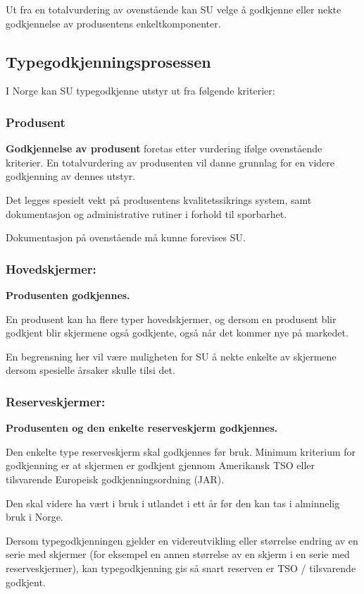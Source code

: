 Ut fra en totalvurdering av ovenstående kan SU velge å godkjenne eller nekte godkjennelse av produsentens enkeltkomponenter.

\subsection{Typegodkjenningsprosessen}
I Norge kan SU typegodkjenne utstyr ut fra følgende kriterier:

\subsubsection{Produsent}
\textbf{Godkjennelse av produsent} foretas etter vurdering ifølge ovenstående kriterier. En totalvurdering av produsenten vil danne grunnlag for en videre godkjenning av dennes utstyr.

Det legges spesielt vekt på produsentens kvalitetssikrings system, samt dokumentasjon og administrative rutiner i forhold til sporbarhet.

Dokumentasjon på ovenstående må kunne forevises SU.

\subsubsection{Hovedskjermer:}
\textbf{Produsenten godkjennes.}

En produsent kan ha flere typer hovedskjermer, og dersom en produsent blir godkjent blir skjermene også godkjente, også når det kommer nye på markedet.

En begrensning her vil være muligheten for SU å nekte enkelte av skjermene dersom spesielle årsaker skulle tilsi det.

\subsubsection{Reserveskjermer:}
\textbf{Produsenten og den enkelte reserveskjerm godkjennes.}

Den enkelte type reserveskjerm skal godkjennes før bruk. Minimum kriterium for godkjenning er at skjermen er godkjent gjennom Amerikansk TSO eller tilsvarende Europeisk godkjenningsordning (JAR).

Den skal videre ha vært i bruk i utlandet i ett år før den kan tas i alminnelig bruk i Norge.

Dersom typegodkjenningen gjelder en videreutvikling eller størrelse endring av en serie med skjermer (for eksempel en annen størrelse av en skjerm i en serie med reserveskjermer), kan typegodkjenning gis så snart reserven er TSO / tilsvarende godkjent.

